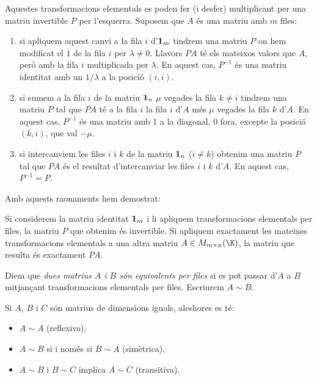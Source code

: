 Aquestes transformacions elementals es poden fer (i desfer) multiplicant per una matriu invertible $P$ per l'esquerra. Suposem que $A$ és una matriu amb $m$ files:
\begin{enumerate}[\bf T1.]
	\item si apliquem aquest canvi a la fila $i$ d'$\mathbf{1}_m$ tindrem una matriu $P$ on hem modificat el $1$ de la fila $i$ per $\lambda\neq 0$. Llavors $PA$ té els mateixos valors que $A$, però amb la fila $i$ multiplicada per $\lambda$. En aquest cas, $P^{-1}$ és una matriu identitat amb un $1/\lambda$ a la posició $(i,i)$.
	\item si sumem a la fila $i$ de la matriu $\mathbf{1}_n$ $\mu$ vegades la fila $k\neq i$ tindrem una matriu $P$ tal que $PA$ té a la fila $i$ la fila $i$ d'$A$ més $\mu$ vegades la fila $k$ d'$A$. En aquest cas, $P^{-1}$ és una matriu amb $1$ a la diagonal, $0$ fora, excepte la posició $(k,i)$, que val $-\mu$.
	\item si intercanviem les files $i$ i $k$ de la matriu $\mathbf{1}_n$ ($i\neq k$) obtenim una matriu $P$ tal que $PA$ és el resultat d'intercanviar les files $i$ i $k$ d'$A$. En aquest cas, $P^{-1}=P$.
\end{enumerate}
Amb aquests raonaments hem demostrat:
\begin{proposicio}
	Si considerem la matriu identitat $\mathbf{1}_m$ i li apliquem transformacions elementals per files, la matriu $P$ que obtenim és invertible. Si apliquem exactament les mateixes transformacions elementals a una altra matriu $A\in M_{m\times n}(\K)$, la matriu que resulta és exactament $PA$.
\end{proposicio}
\begin{definicio}
	Diem que \emph{dues matrius $A$ i $B$ són equivalents per files} si es pot passar d'$A$ a $B$ mitjançant transformacions elementals per files. Escriurem $A \sim B$.
\end{definicio}
\begin{proposicio} \label{prop:relequiv} Si $A$, $B$ i $C$ són matrius de dimensions iguals, aleshores es té:
	\begin{itemize}
		\item $A \sim A$ (reflexiva),
		\item $A \sim B$ si i només si $B \sim A$ (simètrica),
		\item $A \sim B$ i $B \sim C$ implica $A \sim C$ (transitiva).
	\end{itemize}
\end{proposicio}
